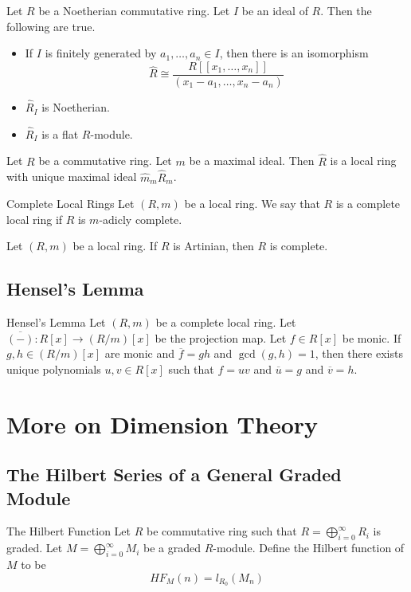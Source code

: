 \documentclass[a4paper]{article}
\begin{document}
\begin{prp}{}{} Let $R$ be a Noetherian commutative ring. Let $I$ be an ideal of $R$. Then the following are true. 
\begin{itemize}
\item If $I$ is finitely generated by $a_1,\dots,a_n\in I$, then there is an isomorphism $$\widehat{R}\cong\frac{R[[x_1,\dots,x_n]]}{(x_1-a_1,\dots,x_n-a_n)}$$
\item $\widehat{R}_I$ is Noetherian. 
\item $\widehat{R}_I$ is a flat $R$-module. 
\end{itemize}
\end{prp}

\begin{prp}{}{} Let $R$ be a commutative ring. Let $m$ be a maximal ideal. Then $\widehat{R}$ is a local ring with unique maximal ideal $\widehat{m}_m\widehat{R}_m$. 
\end{prp}

\begin{defn}{Complete Local Rings}{} Let $(R,m)$ be a local ring. We say that $R$ is a complete local ring if $R$ is $m$-adicly complete. 
\end{defn}

\begin{lmm}{}{} Let $(R,m)$ be a local ring. If $R$ is Artinian, then $R$ is complete. 
\end{lmm}

\subsection{Hensel's Lemma}
\begin{thm}{Hensel's Lemma}{} Let $(R,m)$ be a complete local ring. Let $\overline{(-)}:R[x]\to(R/m)[x]$ be the projection map. Let $f\in R[x]$ be monic. If $g,h\in(R/m)[x]$ are monic and $\overline{f}=gh$ and $\gcd(g,h)=1$, then there exists unique polynomials $u,v\in R[x]$ such that $f=uv$ and $\overline{u}=g$ and $\overline{v}=h$. 
\end{thm}

\pagebreak
\section{More on Dimension Theory}
\subsection{The Hilbert Series of a General Graded Module}
\begin{defn}{The Hilbert Function}{} Let $R$ be commutative ring such that $R=\bigoplus_{i=0}^\infty R_i$ is graded. Let $M=\bigoplus_{i=0}^\infty M_i$ be a graded $R$-module. Define the Hilbert function of $M$ to be $$HF_M(n)=l_{R_0}(M_n)$$
\end{defn}
\end{document}
